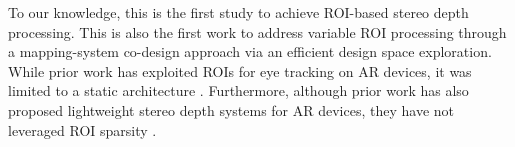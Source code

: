 To our knowledge, this is the first study to achieve ROI-based stereo depth processing.
This is also the first work to address variable ROI processing through a mapping-system co-design approach via an efficient design space exploration.
While prior work has exploited ROIs for eye tracking on AR devices, it was limited to a static architecture \cite{eyecod}.
Furthermore, although prior work has also proposed lightweight stereo depth systems for AR devices, they have not leveraged ROI sparsity \cite{tiefenrausch}.